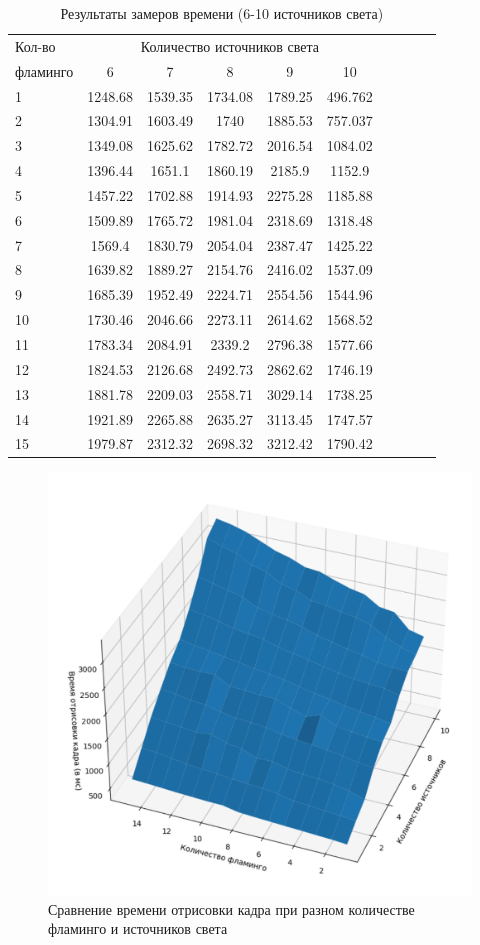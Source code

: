 \begin{table}[htbp]
	\centering
	\caption{Результаты замеров времени (6-10 источников света)}
	\label{tbl:time2}
	\begin{tabular}{|p{2cm}|c|c|c|c|c|c|c|c|c|}
		\hline
		Кол-во & \multicolumn{5}{c|}{Количество источников света} \\ \cline{2-6} 
		фламинго & 6 & 7 & 8 & 9 & 10 \\ \hline
		1 & 1248.68 & 1539.35 & 1734.08 & 1789.25 & 496.762 \\ \hline
		2 & 1304.91 & 1603.49 & 1740 & 1885.53 & 757.037 \\ \hline
		3 & 1349.08 & 1625.62 & 1782.72 & 2016.54 & 1084.02 \\ \hline
		4 & 1396.44 & 1651.1 & 1860.19 & 2185.9 & 1152.9 \\ \hline
		5 & 1457.22 & 1702.88 & 1914.93 & 2275.28 & 1185.88 \\ \hline
		6 & 1509.89 & 1765.72 & 1981.04 & 2318.69 & 1318.48 \\ \hline
		7 & 1569.4 & 1830.79 & 2054.04 & 2387.47 & 1425.22 \\ \hline
		8 & 1639.82 & 1889.27 & 2154.76 & 2416.02 & 1537.09 \\ \hline
		9 & 1685.39 & 1952.49 & 2224.71 & 2554.56 & 1544.96 \\ \hline
		10 & 1730.46 & 2046.66 & 2273.11 & 2614.62 & 1568.52 \\ \hline
		11 & 1783.34 & 2084.91 & 2339.2 & 2796.38 & 1577.66 \\ \hline
		12 & 1824.53 & 2126.68 & 2492.73 & 2862.62 & 1746.19 \\ \hline
		13 & 1881.78 & 2209.03 & 2558.71 & 3029.14 & 1738.25 \\ \hline
		14 & 1921.89 & 2265.88 & 2635.27 & 3113.45 & 1747.57 \\ \hline
		15 & 1979.87 & 2312.32 & 2698.32 & 3212.42 & 1790.42 \\ \hline
	\end{tabular}
\end{table}

\begin{figure}[h!]
	\centering
	\includegraphics[width=0.7\linewidth]{img/graph_3d}
	\caption{Сравнение времени отрисовки кадра при разном количестве фламинго и источников света}
	\label{fig:graph_3d}
\end{figure}

